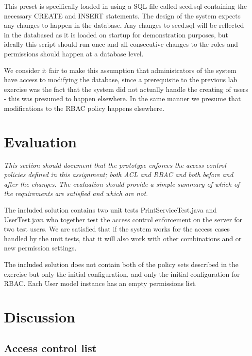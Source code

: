 \documentclass[12pt]{article}
\begin{document}
This preset is specifically loaded in using a SQL file called seed.sql containing the necessary CREATE and INSERT statements. The design of the system expects any changes to happen in the database. Any changes to seed.sql will be reflected in the databased as it is loaded on startup for demonstration purposes, but ideally this script should run once and all consecutive changes to the roles and permissions should happen at a database level.

We consider it fair to make this assumption that administrators of the system have access to modifying the database, since a prerequisite to the previous lab exercise was the fact that the system did not actually handle the creating of users - this was presumed to happen elsewhere. In the same manner we presume that modifications to the RBAC policy happens elsewhere.

\newpage

\section{Evaluation}
\label{sec:Evaluation}

\textit{This section should document that the prototype enforces the access control policies defined in this assignment; both ACL and RBAC and both before and after the changes. The evaluation should provide a simple summary of which of the requirements are satisfied and which are not.}

The included solution contains two unit tests PrintServiceTest.java and UserTest.java who together test the access control enforcement on the server for two test users. We are satisfied that if the system works for the access cases handled by the unit tests, that it will also work with other combinations and or new permission settings.

The included solution does not contain both of the policy sets described in the exercise but only the initial configuration, and only the initial configuration for RBAC. Each User model instance has an empty permissions list.

\section{Discussion}
\label{sec:Discussion}

\subsection{Access control list}
\label{sub:Access control list}
\end{document}
